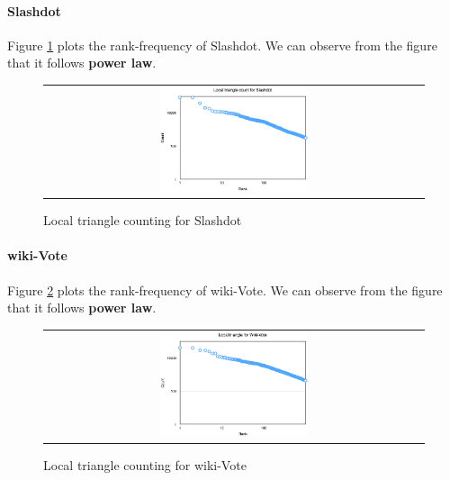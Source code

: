 \paragraph{Slashdot}
Figure \ref{t7:slashdot} plots the rank-frequency of Slashdot. We can observe from the figure that it follows {\bf power law}. 
\begin{figure}[!htbf]
\begin{center}
\begin{tabular}{c}
     \includegraphics[width=0.4\textwidth]{FIG/t7_slashdot.png}
\end{tabular}
\caption{Local triangle counting for Slashdot}
\label{t7:slashdot}
\end{center}
\end{figure}

\paragraph{wiki-Vote}
Figure \ref{t7:wikivote} plots the rank-frequency of wiki-Vote. We can observe from the figure that it follows {\bf power law}. 
\begin{figure}[!htbf]
\begin{center}
\begin{tabular}{c}
     \includegraphics[width=0.4\textwidth]{FIG/t7_wikivote.png}
\end{tabular}
\caption{Local triangle counting for wiki-Vote}
\label{t7:wikivote}
\end{center}
\end{figure}

